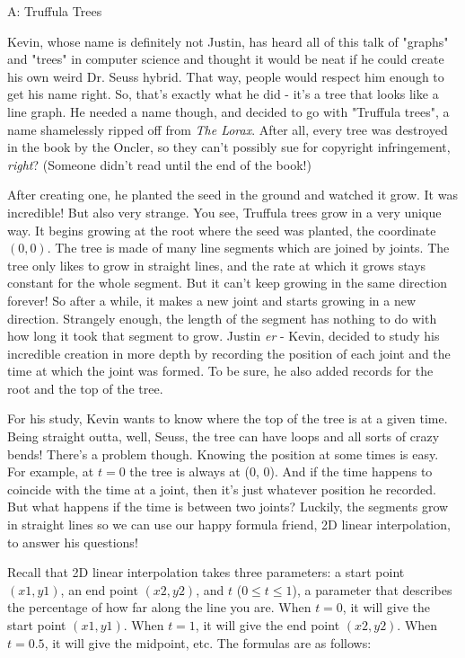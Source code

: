 

\begin{problem}{A: Truffula Trees}

Kevin, whose name is definitely not Justin, has heard all of this talk of "graphs" and "trees" in computer science and thought it would be neat if he could create his own weird Dr. Seuss hybrid. That way, people would respect him enough to get his name right. So, that's exactly what he did - it's a tree that looks like a line graph. He needed a name though, and decided to go with "Truffula trees", a name shamelessly ripped off from \textit{The Lorax}. After all, every tree was destroyed in the book by the Oncler, so they can't possibly sue for copyright infringement, \textit{right}? (Someone didn't read until the end of the book!)

After creating one, he planted the seed in the ground and watched it grow. It was incredible! But also very strange. You see, Truffula trees grow in a very unique way. It begins growing at the root where the seed was planted, the coordinate $(0, 0)$. The tree is made of many line segments which are joined by joints. The tree only likes to grow in straight lines, and the rate at which it grows stays constant for the whole segment. But it can't keep growing in the same direction forever! So after a while, it makes a new joint and starts growing in a new direction. Strangely enough, the length of the segment has nothing to do with how long it took that segment to grow. Justin \textit{er} - Kevin, decided to study his incredible creation in more depth by recording the position of each joint and the time at which the joint was formed. To be sure, he also added records for the root and the top of the tree.

For his study, Kevin wants to know where the top of the tree is at a given time. Being straight outta, well, Seuss, the tree can have loops and all sorts of crazy bends! There's a problem though. Knowing the position at some times is easy. For example, at $t = 0$ the tree is always at (0, 0). And if the time happens to coincide with the time at a joint, then it's just whatever position he recorded. But what happens if the time is between two joints? Luckily, the segments grow in straight lines so we can use our happy formula friend, 2D linear interpolation, to answer his questions!

Recall that 2D linear interpolation takes three parameters: a start point $(x1, y1)$, an end point $(x2, y2)$, and $t$ ($0 \leq t \leq 1$), a parameter that describes the percentage of how far along the line you are. When $t = 0$, it will give the start point $(x1, y1)$. When $t = 1$, it will give the end point $(x2, y2)$. When $t = 0.5$, it will give the midpoint, etc. The formulas are as follows:


\end{problem}
